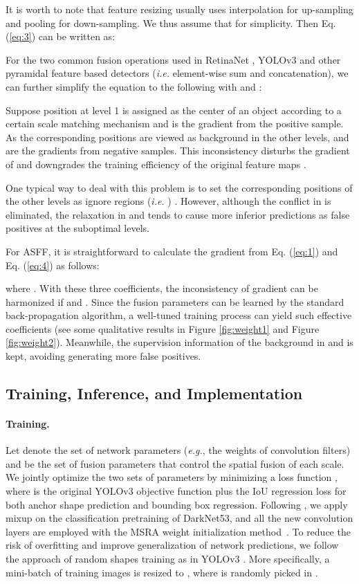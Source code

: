 \documentclass[10pt,twocolumn,letterpaper]{article}
\begin{document}
It is worth to note that feature resizing usually uses interpolation for up-sampling and pooling for down-sampling. We thus assume that  for simplicity. Then Eq. (\ref{eq:3}) can be written as:


For the two common fusion operations used in RetinaNet \cite{focal-loss}, YOLOv3 \cite{yolov3} and other pyramidal feature based detectors (\emph{i.e.} element-wise sum and concatenation), we can further simplify the equation to the following with  and :


Suppose position  at level 1 is assigned as the center of an object according to a certain scale matching mechanism and  is the gradient from  the positive sample. As the corresponding positions are viewed as background in the other levels,  and  are the gradients from negative samples. This inconsistency disturbs the gradient of  and downgrades the training efficiency of the original feature maps . 

One typical way to deal with this problem is to set the corresponding positions of the other levels as ignore regions (\emph{i.e.} ) \cite{guide,FSAF}. However, although the conflict in  is eliminated, the relaxation in  and  tends to cause more inferior predictions as false positives at the suboptimal levels. 

For ASFF, it is straightforward to calculate the gradient from Eq. (\ref{eq:1}) and Eq. (\ref{eq:4}) as follows:

where . With these three coefficients, the inconsistency of gradient can be harmonized if  and . Since the fusion parameters can be learned by the standard back-propagation algorithm, a well-tuned training process can yield such effective coefficients (see some qualitative results in Figure \ref{fig:weight1} and Figure \ref{fig:weight2}). Meanwhile, the supervision information of the background in  and  is kept, avoiding generating more false positives.   

\subsection{Training, Inference, and Implementation}
\paragraph{Training.} Let  denote the set of network parameters (\emph{e.g.}, the weights of convolution filters) and  be the set of fusion parameters that control the spatial fusion of each scale. We jointly optimize the two sets of parameters by minimizing a loss function , where  is the original YOLOv3 objective function plus the IoU regression loss \cite{iouloss} for both anchor shape prediction and bounding box regression. Following \cite{bag}, we apply mixup on the classification pretraining of DarkNet53, and all the new convolution layers are employed with the MSRA weight initialization method~\cite{MSRA}. To reduce the risk of overfitting and improve generalization of network predictions, we follow the approach of random shapes training as in YOLOv3 \cite{yolov3}. More specifically, a mini-batch of  training images is resized to , where  is randomly picked in .
\end{document}
